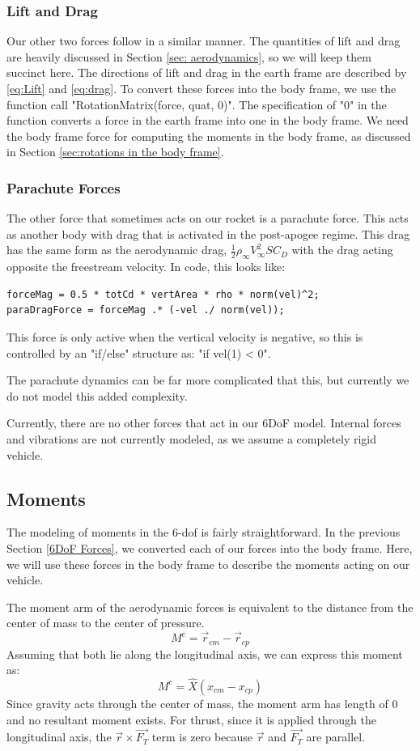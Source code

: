 \documentclass[12pt]{report}
\begin{document}
\subsubsection{Lift and Drag}
Our other two forces follow in a similar manner. The quantities of lift and drag are heavily discussed in Section \ref{sec: aerodynamics}, so we will keep them succinct here. The directions of lift and drag in the earth frame are described by \eqref{eq:Lift} and \eqref{eq:drag}. To convert these forces into the body frame, we use the function call "RotationMatrix(force, quat, 0)". The specification of "0" in the function converts a force in the earth frame into one in the body frame. We need the body frame force for computing the moments in the body frame, as discussed in Section \ref{sec:rotations in the body frame}.
\subsubsection{Parachute Forces}
The other force that sometimes acts on our rocket is a parachute force. This acts as another body with drag that is activated in the post-apogee regime. This drag has the same form as the aerodynamic drag, $\frac{1}{2}\rho_{\infty} V_{\infty}^2SC_D$ with the drag acting opposite the freestream velocity. In code, this looks like:
\begin{lstlisting}[style=Matlab-editor]
forceMag = 0.5 * totCd * vertArea * rho * norm(vel)^2;
paraDragForce = forceMag .* (-vel ./ norm(vel)); 
\end{lstlisting}
This force is only active when the vertical velocity is negative, so this is controlled by an "if/else" structure as: "if vel(1) < 0". 

The parachute dynamics can be far more complicated that this, but currently we do not model this added complexity. 

Currently, there are no other forces that act in our 6DoF model. Internal forces and vibrations are not currently modeled, as we assume a completely rigid vehicle.
\subsection{Moments}
The modeling of moments in the 6-\gls{dof} is fairly straightforward. In the previous Section \ref{6DoF Forces}, we converted each of our forces into the body frame. Here, we will use these forces in the body frame to describe the moments acting on our vehicle. 

The moment arm of the aerodynamic forces is equivalent to the distance from the center of mass to the center of pressure. 
\begin{equation}
    M^c=\vec{r}_{cm}-\vec{r}_{cp}
\end{equation}
Assuming that both lie along the longitudinal axis, we can express this moment as:
\begin{equation}
    M^c=\hat{X}(x_{cm}-x_{cp})
\end{equation}
Since gravity acts through the center of mass, the moment arm has length of 0 and no resultant moment exists. For thrust, since it is applied through the longitudinal axis, the $\vec{r}\times \vec{F_T}$ term is zero because $\vec{r}$ and $\vec{F_T}$ are parallel.
\end{document}
